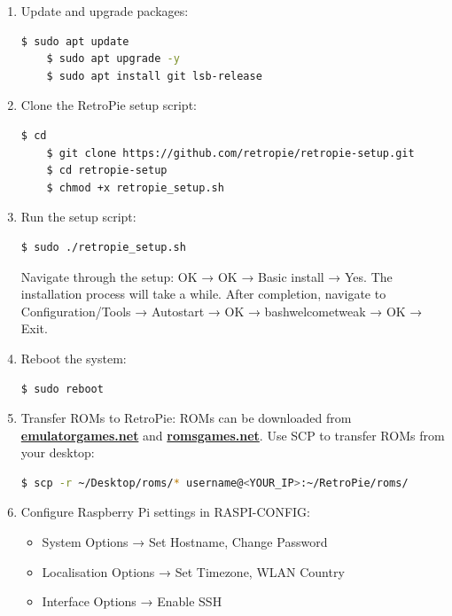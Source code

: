\documentclass[a4paper,12pt]{article}
\begin{document}
\begin{enumerate}
    \item Update and upgrade packages:
    \begin{lstlisting}[language=bash, breaklines=true, breakatwhitespace=true, columns=fullflexible]
    $ sudo apt update
    $ sudo apt upgrade -y
    $ sudo apt install git lsb-release
    \end{lstlisting}

   \item Clone the RetroPie setup script:
    \begin{lstlisting}[language=bash, breaklines=true, breakatwhitespace=true, columns=fullflexible]
    $ cd
    $ git clone https://github.com/retropie/retropie-setup.git
    $ cd retropie-setup
    $ chmod +x retropie_setup.sh
    \end{lstlisting}

    \item Run the setup script:
    \begin{lstlisting}[language=bash, breaklines=true, breakatwhitespace=true, columns=fullflexible]
    $ sudo ./retropie_setup.sh
    \end{lstlisting}
    Navigate through the setup: OK → OK → Basic install → Yes. The installation process will take a while. After completion, navigate to Configuration/Tools → Autostart → OK → bashwelcometweak → OK → Exit.

    \item Reboot the system:
    \begin{lstlisting}[language=bash, breaklines=true, breakatwhitespace=true, columns=fullflexible]
    $ sudo reboot
    \end{lstlisting}

    \item Transfer ROMs to RetroPie:
    ROMs can be downloaded from \href{https://www.emulatorgames.net}{\textbf{\color{blue}emulatorgames.net}} and \href{https://www.romsgames.net}{\textbf{\color{blue}romsgames.net}}. Use SCP to transfer ROMs from your desktop:
    \begin{lstlisting}[language=bash, breaklines=true, breakatwhitespace=true, columns=fullflexible]
    $ scp -r ~/Desktop/roms/* username@<YOUR_IP>:~/RetroPie/roms/
    \end{lstlisting}

    \item Configure Raspberry Pi settings in RASPI-CONFIG:
    \begin{itemize}
        \item System Options → Set Hostname, Change Password
        \item Localisation Options → Set Timezone, WLAN Country
        \item Interface Options → Enable SSH
    \end{itemize}


\end{enumerate}
\end{document}
